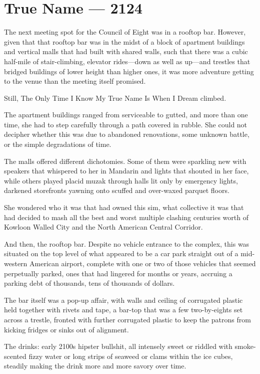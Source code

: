 \hypertarget{true-name-2124}{%
\chapter{True Name — 2124}\label{true-name-2124}}

The next meeting spot for the Council of Eight was in a rooftop bar. However, given that that rooftop bar was in the midst of a block of apartment buildings and vertical malls that had built with shared walls, such that there was a cubic half-mile of stair-climbing, elevator rides---down as well as up---and trestles that bridged buildings of lower height than higher ones, it was more adventure getting to the venue than the meeting itself promised.

Still, The Only Time I Know My True Name Is When I Dream climbed.

The apartment buildings ranged from serviceable to gutted, and more than one time, she had to step carefully through a path covered in rubble. She could not decipher whether this was due to abandoned renovations, some unknown battle, or the simple degradations of time.

The malls offered different dichotomies. Some of them were sparkling new with speakers that whispered to her in Mandarin and lights that shouted in her face, while others played placid muzak through halls lit only by emergency lights, darkened storefronts yawning onto scuffed and over-waxed parquet floors.

She wondered who it was that had owned this sim, what collective it was that had decided to mash all the best and worst multiple clashing centuries worth of Kowloon Walled City and the North American Central Corridor.

And then, the rooftop bar. Despite no vehicle entrance to the complex, this was situated on the top level of what appeared to be a car park straight out of a mid-western American airport, complete with one or two of those vehicles that seemed perpetually parked, ones that had lingered for months or years, accruing a parking debt of thousands, tens of thousands of dollars.

The bar itself was a pop-up affair, with walls and ceiling of corrugated plastic held together with rivets and tape, a bar-top that was a few two-by-eights set across a trestle, fronted with further corrugated plastic to keep the patrons from kicking fridges or sinks out of alignment.

The drinks: early 2100s hipster bullshit, all intensely sweet or riddled with smoke-scented fizzy water or long strips of seaweed or clams within the ice cubes, steadily making the drink more and more savory over time.

